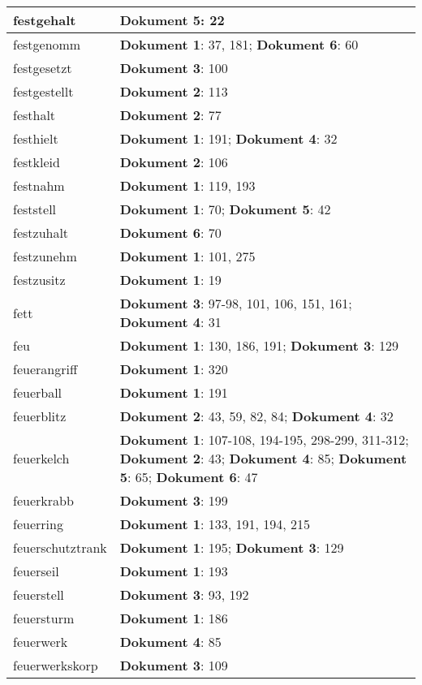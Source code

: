 \documentclass[a5paper]{article}
\begin{document}
\begin{longtable}[l]{|l|p{3in}|}
\hline
festgehalt & \textbf{Dokument 5}: 22 \\
\hline
festgenomm & \textbf{Dokument 1}: 37, 181; \textbf{Dokument 6}: 60 \\
\hline
festgesetzt & \textbf{Dokument 3}: 100 \\
\hline
festgestellt & \textbf{Dokument 2}: 113 \\
\hline
festhalt & \textbf{Dokument 2}: 77 \\
\hline
festhielt & \textbf{Dokument 1}: 191; \textbf{Dokument 4}: 32 \\
\hline
festkleid & \textbf{Dokument 2}: 106 \\
\hline
festnahm & \textbf{Dokument 1}: 119, 193 \\
\hline
feststell & \textbf{Dokument 1}: 70; \textbf{Dokument 5}: 42 \\
\hline
festzuhalt & \textbf{Dokument 6}: 70 \\
\hline
festzunehm & \textbf{Dokument 1}: 101, 275 \\
\hline
festzusitz & \textbf{Dokument 1}: 19 \\
\hline
fett & \textbf{Dokument 3}: 97-98, 101, 106, 151, 161; \textbf{Dokument 4}: 31 \\
\hline
feu & \textbf{Dokument 1}: 130, 186, 191; \textbf{Dokument 3}: 129 \\
\hline
feuerangriff & \textbf{Dokument 1}: 320 \\
\hline
feuerball & \textbf{Dokument 1}: 191 \\
\hline
feuerblitz & \textbf{Dokument 2}: 43, 59, 82, 84; \textbf{Dokument 4}: 32 \\
\hline
feuerkelch & \textbf{Dokument 1}: 107-108, 194-195, 298-299, 311-312; \textbf{Dokument 2}: 43; \textbf{Dokument 4}: 85; \textbf{Dokument 5}: 65; \textbf{Dokument 6}: 47 \\
\hline
feuerkrabb & \textbf{Dokument 3}: 199 \\
\hline
feuerring & \textbf{Dokument 1}: 133, 191, 194, 215 \\
\hline
feuerschutztrank & \textbf{Dokument 1}: 195; \textbf{Dokument 3}: 129 \\
\hline
feuerseil & \textbf{Dokument 1}: 193 \\
\hline
feuerstell & \textbf{Dokument 3}: 93, 192 \\
\hline
feuersturm & \textbf{Dokument 1}: 186 \\
\hline
feuerwerk & \textbf{Dokument 4}: 85 \\
\hline
feuerwerkskorp & \textbf{Dokument 3}: 109 \\

\end{longtable}
\end{document}
